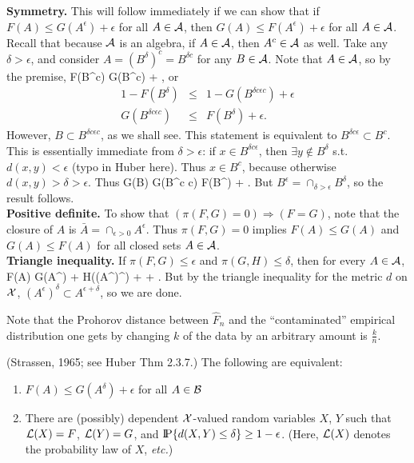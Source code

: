 \noindent
{\bf Symmetry.}
This will follow immediately if we can show
that if $F(A) \le G(A^\epsilon) + \epsilon$ for all $A \in {\cal A}$, then
$G(A) \le F(A^\epsilon) + \epsilon$ for all $A \in {\cal A}$.
Recall that because ${\cal A}$ is an algebra, if $A \in {\cal A}$, then $A^c \in {\cal A}$
as well.
Take any $\delta > \epsilon$, and consider $A = (B^\delta)^c = B^{\delta c}$ for any
$B \in {\cal A}$.
Note that $A \in {\cal A}$, so by the premise,
\beq
    F(B^{\delta c}) \le G(B^{\delta c\epsilon}) + \epsilon ,
\eeq
or
\begin{eqnarray}
    1 - F(B^\delta) &\le& 1 - G(B^{\delta c \epsilon c}) + \epsilon \\
    G(B^{\delta c \epsilon c}) &\le & F(B^\delta) + \epsilon.
\end{eqnarray}
However, $B \subset B^{\delta c \epsilon c} $, as we shall see.
This statement is equivalent to $B^{\delta c \epsilon} \subset B^c$.
This is essentially immediate from $\delta > \epsilon$: if $x \in B^{\delta c \epsilon}$,
then $\exists y \not \in B^\delta$ s.t. $d(x,y) < \epsilon$ (typo in Huber here).
Thus $x \in B^c$, because otherwise $d(x, y) > \delta > \epsilon$.
Thus
\beq
    G(B) \le G(B^{\delta c \epsilon c}) \le  F(B^\delta) + \epsilon .
\eeq
But $B^\epsilon = \cap_{\delta > \epsilon} B^{\delta}$, so the result follows.
\\[2ex]

\noindent
{\bf Positive definite.}
To show that $(\pi(F,G) = 0) \Rightarrow (F = G)$, note that
the closure of $A$ is $\bar{A} = \cap_{\epsilon > 0} A^\epsilon$.
Thus  $\pi(F,G) = 0 $ implies $F(A) \le G(A)$ and $G(A) \le F(A)$ for all
closed sets $A \in {\cal A}$.
\\[2ex]

\noindent
{\bf Triangle inequality.}
If $\pi(F, G) \le \epsilon$ and $\pi(G, H) \le \delta$, then for every $A \in {\cal A}$,
\beq
    F(A) \le G(A^\epsilon) + \epsilon \le H((A^\epsilon)^\delta) + \epsilon +
    \delta.
\eeq
But by the triangle inequality for the metric $d$ on ${\cal X}$,
$ (A^\epsilon)^\delta  \subset A^{\epsilon+\delta}$, so we are done.

Note that the Prohorov distance between $\hat{F}_n$ and the ``contaminated''
empirical distribution one gets by changing $k$ of the data by an
arbitrary amount is $\frac{k}{n}$.

\begin{Theorem}(Strassen, 1965; see Huber Thm 2.3.7.)
    The following are equivalent:
    \begin{enumerate}
        \item
            $F(A) \le G(A^\delta) + \epsilon$ for all $A \in {\cal B}$
        \item
            There are (possibly) dependent ${\cal X}$-valued random variables $X$, $Y$  such that
            ${\cal L}(X) = F$, ${\cal L}(Y) = G$, and $\hbox{I\kern-.17em\hbox{P}}\{d(X,Y) \le \delta\} \ge 1 - \epsilon$.
            (Here, ${\cal L}(X)$ denotes the probability law of $X$, {\em etc.})
    \end{enumerate}
\end{Theorem}

